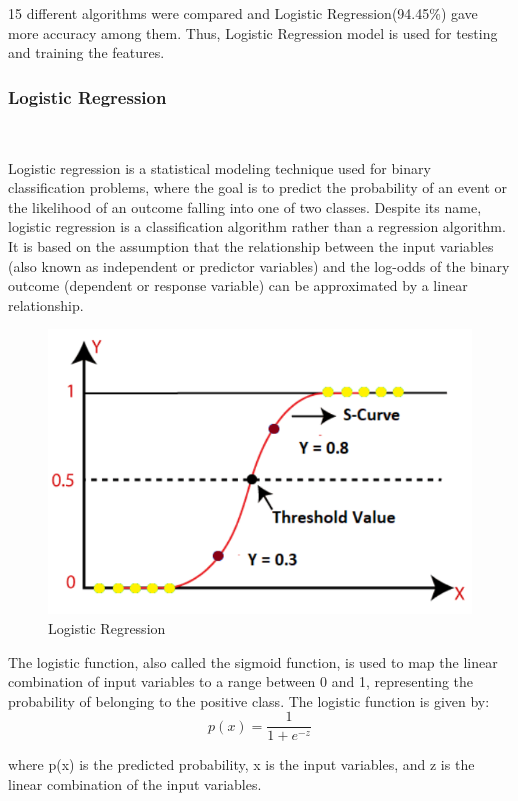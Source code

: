 \documentclass[conference]{IEEEtran}
\begin{document}
\par 15 different algorithms were compared and Logistic Regression(94.45\%) gave more accuracy among them. Thus, Logistic Regression model is used for testing and training the features.  
\subsubsection*{Logistic Regression}\\
\par Logistic regression is a statistical modeling technique used for binary classification problems, where the goal is to predict the probability of an event or the likelihood of an outcome falling into one of two classes. Despite its name, logistic regression is a classification algorithm rather than a regression algorithm. It is based on the assumption that the relationship between the input variables (also known as independent or predictor variables) and the log-odds of the binary outcome (dependent or response variable) can be approximated by a linear relationship.
\begin{figure}[H]
\centerline{\includegraphics[scale=0.4]{LRgraph.png}}
\caption{Logistic Regression}
\label{fig}
\end{figure}
\par The logistic function, also called the sigmoid function, is used to map the linear combination of input variables to a range between 0 and 1, representing the probability of belonging to the positive class. The logistic function is given by:
\[
p(x) = \frac{1}{1 + e^{-z}}
\]


where p(x) is the predicted probability, x is the input variables, and z is the linear combination of the input variables.
\end{document}
